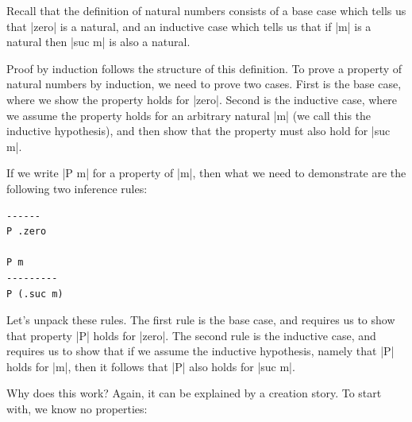 \documentclass{memoir}
\begin{document}
\par
Recall that the definition of natural numbers consists of a base case which
tells us that \LeanVerb|zero| is a natural, and an inductive case which tells us that if
\LeanVerb|m| is a natural then \LeanVerb|suc m| is also a natural.

\par
\par\noindent Proof by induction follows the structure of this definition. To prove a property
of natural numbers by induction, we need to prove two cases. First is the base
case, where we show the property holds for \LeanVerb|zero|. Second is the inductive case,
where we assume the property holds for an arbitrary natural \LeanVerb|m| (we call this
the inductive hypothesis), and then show that the property must also hold for
\LeanVerb|suc m|.

\par
If we write \LeanVerb|P m| for a property of \LeanVerb|m|, then what we need to demonstrate are
the following two inference rules:

\par
\par\noindent \begin{verbatim}
------
P .zero

P m
---------
P (.suc m)
\end{verbatim}

\par
Let's unpack these rules. The first rule is the base case, and requires us to
show that property \LeanVerb|P| holds for \LeanVerb|zero|. The second rule is the inductive case,
and requires us to show that if we assume the inductive hypothesis, namely that
\LeanVerb|P| holds for \LeanVerb|m|, then it follows that \LeanVerb|P| also holds for \LeanVerb|suc m|.

\par
Why does this work? Again, it can be explained by a creation story. To start
with, we know no properties:
\end{document}
